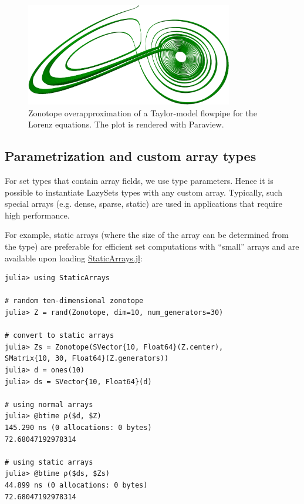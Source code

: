 \begin{figure}[tb]
	\centering
	\includegraphics[width=\linewidth,keepaspectratio,height=4.5cm]{img/lorenz}
	\vspace*{.5mm}
	\caption{Zonotope overapproximation of a Taylor-model flowpipe for the Lorenz equations. The plot is rendered with Paraview.}
	\label{fig:flowpipe_lorenz}
\end{figure}

\subsection{Parametrization and custom array types} \label{sec:custom_arrays}

For set types that contain array fields, we use type parameters. Hence it is possible to instantiate LazySets types with any custom array. Typically, such special arrays (e.g. dense, sparse, static) are used in applications that require high performance.

\smallskip

For example, static arrays (where the size of the array can be determined from the type) are preferable for efficient set computations with ``small'' arrays and are available upon loading \href{https://github.com/JuliaArrays/StaticArrays.jl}{StaticArrays.jl}:

\begin{minipage}{\linewidth}
	\vspace{-\abovedisplayskip}
	\begin{lstlisting}
julia> using StaticArrays

# random ten-dimensional zonotope
julia> Z = rand(Zonotope, dim=10, num_generators=30)

# convert to static arrays
julia> Zs = Zonotope(SVector{10, Float64}(Z.center),
SMatrix{10, 30, Float64}(Z.generators))
julia> d = ones(10)
julia> ds = SVector{10, Float64}(d)

# using normal arrays
julia> @btime ρ($d, $Z)
145.290 ns (0 allocations: 0 bytes)
72.68047192978314

# using static arrays
julia> @btime ρ($ds, $Zs)
44.899 ns (0 allocations: 0 bytes)
72.68047192978314
	\end{lstlisting}
\end{minipage}

